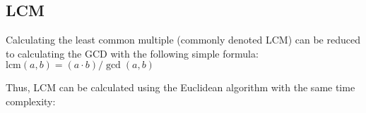 \subsection{LCM}

Calculating the least common multiple (commonly denoted LCM) can be reduced to calculating the GCD with the following simple formula: $\text{lcm}(a, b) = (a \cdot b) / \gcd(a, b)$

Thus, LCM can be calculated using the Euclidean algorithm with the same time complexity:
